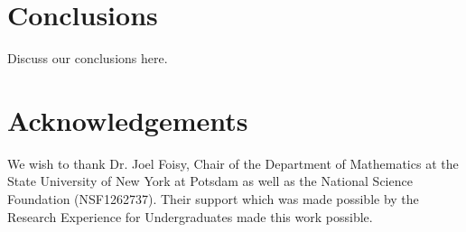 

\section{Conclusions}

Discuss our conclusions here.

\section{Acknowledgements}

We wish to thank Dr. Joel Foisy, Chair of the Department of
Mathematics at the State University of New York at Potsdam as well as
the National Science Foundation (NSF1262737). Their support which was
made possible by the Research Experience for Undergraduates made this
work possible.


